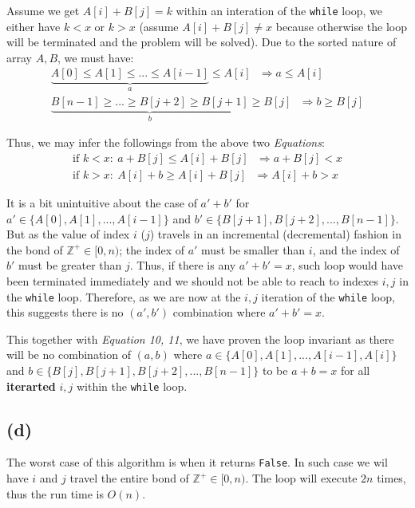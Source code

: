 \documentclass[12pt]{article}
\newcommand{\inlinecode}{\texttt}
\begin{document}
Assume we get $A[i] + B[j] = k$ within an interation of the \inlinecode{while} loop, we either have $k < x$ or $k > x$ (assume $A[i] + B[j] \neq x$ because otherwise the loop will be terminated and the problem will be solved). Due to the sorted nature of array $A, B$, we must have:
\begin{gather}
    \underbrace{A[0] \leq A[1] \leq ... \leq A[i-1]}_{a} \leq A[i]  \ \ \ \Rightarrow a \leq A[i]\\
    \underbrace{B[n-1] \geq ... \geq B[j+2] \geq B[j+1]}_{b} \geq B[j] \ \ \ \Rightarrow b \geq B[j]
\end{gather}

Thus, we may infer the followings from the above two \textit{Equations}:
\begin{gather}
    \text{if } k < x: \ a + B[j] \leq A[i] + B[j]  \ \ \ \Rightarrow a + B[j] < x\\
    \text{if } k > x: \ A[i] + b \geq A[i] + B[j]  \ \ \ \Rightarrow A[i] + b > x
\end{gather}

It is a bit unintuitive about the case of $a' + b'$ for $a' \in \{A[0], A[1], ..., A[i-1]\}$ and $b' \in \{B[j+1], B[j+2], ..., B[n-1]\}$. But as the value of index $i$ ($j$) travels in an incremental (decremental) fashion in the bond of $\mathbb{Z^+} \in [0, n)$; the index of $a'$ must be smaller than $i$, and the index of $b'$ must be greater than $j$. Thus, if there is any $a' + b' = x$, such loop would have been terminated immediately and we should not be able to reach to indexes $i, j$ in the \inlinecode{while} loop. Therefore, as we are now at the $i, j$ iteration of the \inlinecode{while} loop, this suggests there is no $(a', b')$ combination where $a' + b' = x$.

This together with \textit{Equation 10, 11}, we have proven the loop invariant as there will be no combination of $(a, b)$ where $a \in \{A[0], A[1], ..., A[i-1], A[i]\}$ and $b \in \{B[j], B[j+1], B[j+2], ..., B[n-1]\}$ to be $a + b = x$ for all \textbf{iterarted} $i, j$ within the \inlinecode{while} loop.

\subsection{(d)}
The worst case of this algorithm is when it returns \inlinecode{False}. In such case we wil have $i$ and $j$ travel the entire bond of $\mathbb{Z^+} \in [0, n)$. The loop will execute $2n$ times, thus the run time is $O(n)$.
\end{document}
